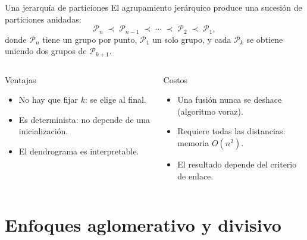 \documentclass[aspectratio=169,11pt]{beamer}
\begin{document}
\begin{frame}{Una jerarquía de particiones}
  El agrupamiento jerárquico produce una sucesión de particiones \alert{anidadas}:
  \[
    \mathcal{P}_n \;\prec\; \mathcal{P}_{n-1} \;\prec\; \cdots \;\prec\; \mathcal{P}_2 \;\prec\; \mathcal{P}_1 ,
  \]
  donde $\mathcal{P}_n$ tiene un grupo por punto, $\mathcal{P}_1$ un solo grupo, y cada
  $\mathcal{P}_{k}$ se obtiene uniendo dos grupos de $\mathcal{P}_{k+1}$.
  \vspace{6pt}
  \begin{columns}[T]
    \begin{block}{Ventajas}
      \begin{itemize}
        \item No hay que fijar $k$: se elige al final.
        \item Es determinista: no depende de una inicialización.
        \item El dendrograma es interpretable.
      \end{itemize}
    \end{block}
    \begin{alertblock}{Costos}
      \begin{itemize}
        \item Una fusión nunca se deshace (algoritmo voraz).
        \item Requiere todas las distancias: memoria $O(n^2)$.
        \item El resultado depende del criterio de enlace.
      \end{itemize}
    \end{alertblock}
  \end{columns}
\end{frame}

\section{Enfoques aglomerativo y divisivo}
\end{document}
